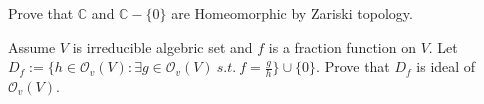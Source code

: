 \documentclass{ctexart}
\newif\ifpreface
\begin{document}
\large
\setlength{\baselineskip}{1.2em}
\ifpreface

\newgeometry{left=2cm,right=2cm,top=2cm,bottom=2cm}
\else
{}
\maketitle
\fi
\begin{problem}
Prove that $\mathbb{C}$ and $\mathbb{C}\minus\{0\}$ are Homeomorphic by Zariski topology.
\end{problem}


\begin{problem}
Assume $V$ is irreducible algebric set and $f$ is a fraction function on $V$. Let $D_f:=\{h\in \mathcal{O}_v(V):\exists g\in \mathcal{O}_v(V)\ s.t.\ f=\frac{g}{h}\}\cup\{0\}$. Prove that $D_f$ is ideal of $\mathcal{O}_v(V)$.
\end{problem}
\end{document}
